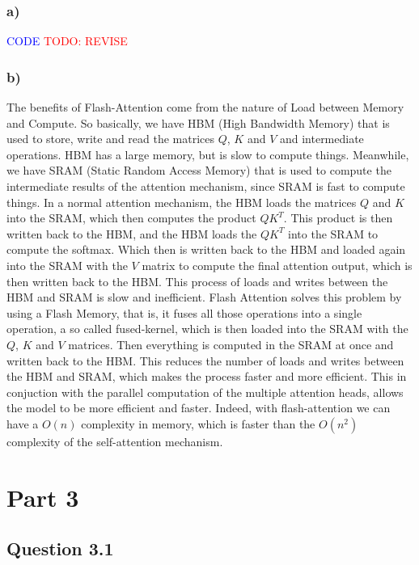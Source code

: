 \documentclass{article}
\begin{document}
\subsubsection*{a)}

\textcolor{blue}{CODE}
\textcolor{red}{TODO: REVISE}

\subsubsection*{b)}

The benefits of Flash-Attention come from the nature of Load between Memory and Compute. So basically, we have HBM (High Bandwidth Memory)
that is used to store, write and read the matrices $Q$, $K$ and $V$ and intermediate operations. HBM has a large memory, but is slow to compute things. Meanwhile, we have
SRAM (Static Random Access Memory) that is used to compute the intermediate results of the attention mechanism, since SRAM is fast to compute things.
In a normal attention mechanism, the HBM loads the matrices $Q$ and $K$ into the SRAM, which then computes the product $QK^T$. 
This product is then written back to the HBM, and the HBM loads the $QK^T$ into the SRAM to compute the softmax. Which then
is written back to the HBM and loaded again into the SRAM with the $V$ matrix to compute the final attention output, which is then written
back to the HBM. This process of loads and writes between the HBM and SRAM is slow and inefficient.
Flash Attention solves this problem by using a Flash Memory, that is, it fuses all those operations into a single operation,
a so called fused-kernel, which is then loaded into the SRAM with the $Q$, $K$ and $V$ matrices. Then everything is computed in the SRAM
at once and written back to the HBM. This reduces the number of loads and writes between the HBM and SRAM, which makes the process
faster and more efficient.
This in conjuction with the parallel computation of the multiple attention heads, allows the model to be more efficient and faster. Indeed,
with flash-attention we can have a $O(n)$ complexity in memory, which is faster than the $O(n^2)$ complexity of the self-attention mechanism.

\newpage

\section*{Part 3}

\subsection*{Question 3.1}
\end{document}

